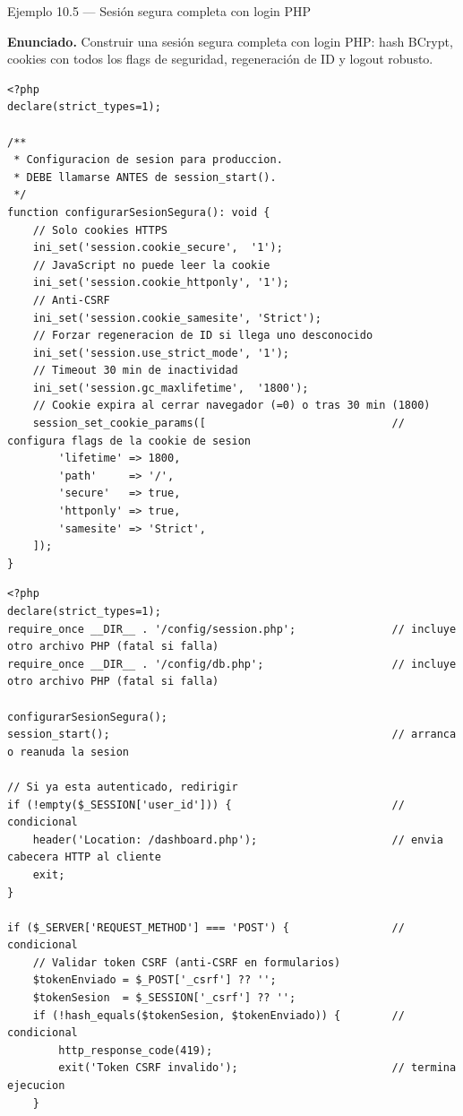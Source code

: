 \documentclass[11pt,a4paper,openany]{book}
\begin{document}
\begin{cajaejemplo}{Ejemplo 10.5 --- Sesión segura completa con login PHP}

\textbf{Enunciado.} Construir una sesión segura completa con login PHP: hash BCrypt, cookies con todos los flags de seguridad, regeneración de ID y logout robusto.

\begin{lstlisting}[style=php,caption={config/session.php (incluir antes de session\_start)},label=lst:10.11]
<?php
declare(strict_types=1);

/**
 * Configuracion de sesion para produccion.
 * DEBE llamarse ANTES de session_start().
 */
function configurarSesionSegura(): void {
    // Solo cookies HTTPS
    ini_set('session.cookie_secure',  '1');
    // JavaScript no puede leer la cookie
    ini_set('session.cookie_httponly', '1');
    // Anti-CSRF
    ini_set('session.cookie_samesite', 'Strict');
    // Forzar regeneracion de ID si llega uno desconocido
    ini_set('session.use_strict_mode', '1');
    // Timeout 30 min de inactividad
    ini_set('session.gc_maxlifetime',  '1800');
    // Cookie expira al cerrar navegador (=0) o tras 30 min (1800)
    session_set_cookie_params([                             // configura flags de la cookie de sesion
        'lifetime' => 1800,
        'path'     => '/',
        'secure'   => true,
        'httponly' => true,
        'samesite' => 'Strict',
    ]);
}
\end{lstlisting}

\begin{lstlisting}[style=php,caption={login.php con todas las prácticas},label=lst:10.12]
<?php
declare(strict_types=1);
require_once __DIR__ . '/config/session.php';               // incluye otro archivo PHP (fatal si falla)
require_once __DIR__ . '/config/db.php';                    // incluye otro archivo PHP (fatal si falla)

configurarSesionSegura();
session_start();                                            // arranca o reanuda la sesion

// Si ya esta autenticado, redirigir
if (!empty($_SESSION['user_id'])) {                         // condicional
    header('Location: /dashboard.php');                     // envia cabecera HTTP al cliente
    exit;
}

if ($_SERVER['REQUEST_METHOD'] === 'POST') {                // condicional
    // Validar token CSRF (anti-CSRF en formularios)
    $tokenEnviado = $_POST['_csrf'] ?? '';
    $tokenSesion  = $_SESSION['_csrf'] ?? '';
    if (!hash_equals($tokenSesion, $tokenEnviado)) {        // condicional
        http_response_code(419);
        exit('Token CSRF invalido');                        // termina ejecucion
    }


\end{lstlisting}
\end{cajaejemplo}
\end{document}

